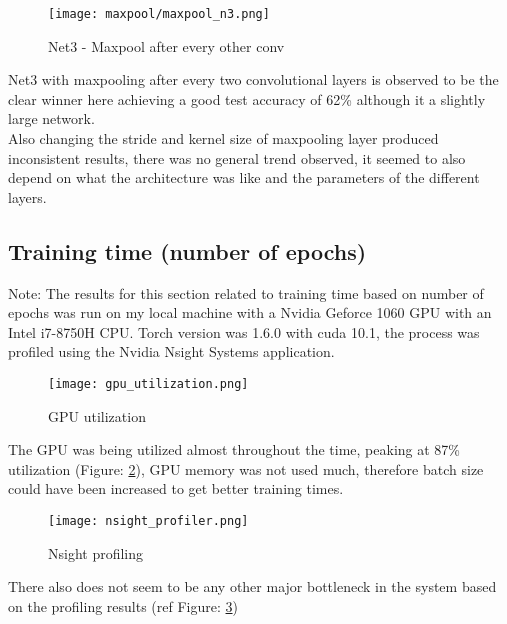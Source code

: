 \documentclass{article}
\begin{document}
\begin{figure} [H]
    \centering
    \texttt{[image: maxpool/maxpool\_n3.png]}
    \vspace{-1.0em}
    \caption{Net3 - Maxpool after every other conv}
    \label{fig:net3_max}
\end{figure}
\noindent
Net3 with maxpooling after every two convolutional layers is observed to be the clear winner here achieving a good test accuracy of 62\% although it a slightly large network.
\\

\noindent
Also changing the stride and kernel size of maxpooling layer produced inconsistent results, there was no general trend observed, it seemed to also depend on what the architecture was like and the parameters of the different layers. 

\subsection{Training time (number of epochs)}
Note: The results for this section related to training time based on number of epochs was run on my local machine with a Nvidia Geforce 1060 GPU with an Intel i7-8750H CPU. Torch version was 1.6.0 with cuda 10.1, the process was profiled using the Nvidia Nsight Systems application.  
\\

\begin{figure}[H]
    \centering
    \texttt{[image: gpu\_utilization.png]}
    \vspace{-1.0em}
    \caption{GPU utilization}
    \label{fig:gpu_util}
\end{figure}

\noindent
The GPU was being utilized almost throughout the time, peaking at 87\% utilization (Figure: \ref{fig:gpu_util}), GPU memory was not used much, therefore batch size could have been increased to get better training times.
\\

\begin{figure}[H]
    \centering
    \texttt{[image: nsight\_profiler.png]}
    \vspace{-1.0em}
    \caption{Nsight profiling}
    \label{fig:nsight_profiling}
\end{figure}

\noindent 
There also does not seem to be any other major bottleneck in the system based on the profiling results (ref Figure: \ref{fig:nsight_profiling})
\\
\end{document}
